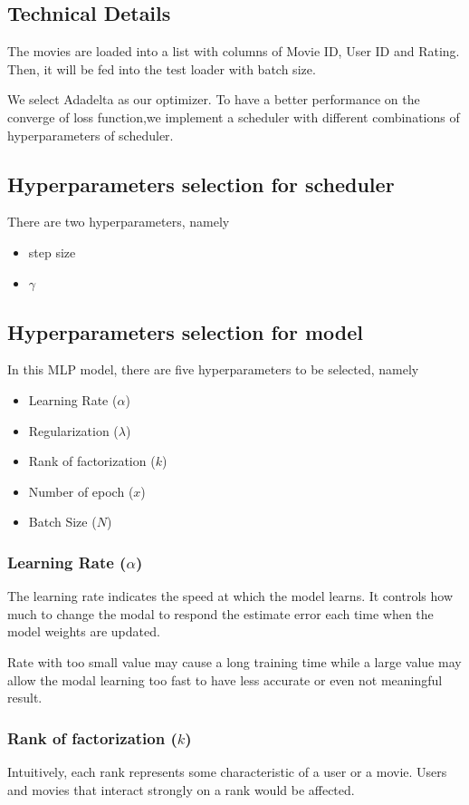\documentclass[final]{cvpr}
\begin{document}
\subsection{Technical Details}

The movies are loaded into a list with columns of Movie ID, User ID and Rating. Then, it will be fed into the test loader with batch size.

We select Adadelta as our optimizer. 
To have a better performance on the converge of loss function,we implement a scheduler with different combinations of hyperparameters of scheduler.

\subsection{Hyperparameters selection for scheduler}
There are two hyperparameters, namely
\begin{itemize}
    \item step size
    \item $\gamma$
\end{itemize}

\subsection{Hyperparameters selection for model}
In this MLP model, there are five hyperparameters to be selected, namely
\begin{itemize}
	\item Learning Rate ($\alpha$)
	\item Regularization ($\lambda$)
	\item Rank of factorization ($k$)
	\item Number of epoch ($x$)
	\item Batch Size ($N$)
\end{itemize}


\subsubsection{Learning Rate ($\alpha$)}
The learning rate indicates the speed at which the model learns. It controls how much to change the modal to respond the estimate error each time when the model weights are updated.

Rate with too small value may cause a long training time while a large value may allow the modal learning too fast to have less accurate or even not meaningful result.

\subsubsection{Rank of factorization ($k$)}
Intuitively, each rank represents some characteristic of a user or a movie. Users and movies that interact strongly on a rank would be affected.
\end{document}

